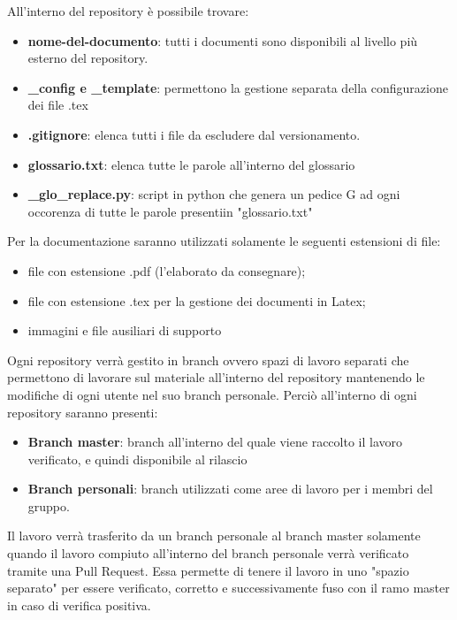 			All'interno del repository è possibile trovare:
			\begin{itemize}
				\item \textbf{nome-del-documento}: tutti i documenti sono disponibili al livello più esterno del repository.
				\item \textbf{\_config e \_template}: permettono la gestione separata della configurazione dei file .tex
				\item \textbf{.gitignore}: elenca tutti i file da escludere dal versionamento.
				\item \textbf{glossario.txt}: elenca tutte le parole all'interno del glossario
				\item \textbf{\_glo\_replace.py}: script in python che genera un pedice G ad ogni occorenza di tutte le parole presentiin "glossario.txt"
			\end{itemize}
			
			Per la documentazione saranno utilizzati solamente le seguenti estensioni di file:
			\begin{itemize}
				\item file con estensione .pdf (l'elaborato da consegnare);
				\item file con estensione .tex per la gestione dei documenti in Latex;
				\item immagini e file ausiliari di supporto
			\end{itemize}
		
			Ogni repository verrà gestito in branch ovvero spazi di lavoro separati che permettono di lavorare sul materiale all'interno del repository mantenendo le modifiche di ogni utente nel suo branch personale. Perciò all'interno di ogni repository saranno presenti:
			\begin{itemize}
				\item \textbf{Branch master}: branch all'interno del quale viene raccolto il lavoro verificato, e quindi disponibile al rilascio
				\item \textbf{Branch personali}: branch utilizzati come aree di lavoro per i membri del gruppo.
			\end{itemize}
			Il lavoro verrà trasferito da un branch personale al branch master solamente quando il lavoro compiuto all'interno del branch personale verrà verificato tramite una Pull Request. Essa permette di tenere il lavoro in uno "spazio separato" per essere verificato, corretto e successivamente fuso con il ramo master in caso di verifica positiva.
			

